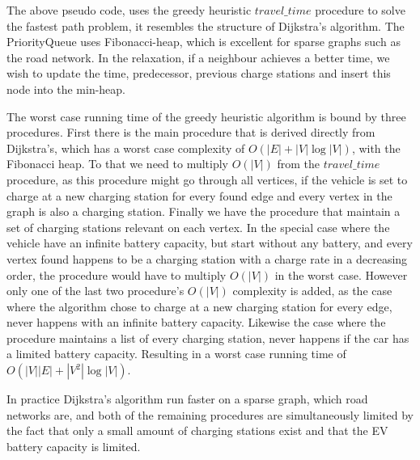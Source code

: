 The above pseudo code, uses the greedy heuristic $travel\_time$ procedure to solve the fastest path problem, it resembles the structure of Dijkstra's algorithm. The PriorityQueue uses Fibonacci-heap, which is excellent for sparse graphs such as the road network. In the relaxation, if a neighbour achieves a better time, we wish to update the time, predecessor, previous charge stations and insert this node into the min-heap.

The worst case running time of the greedy heuristic algorithm is bound by three procedures. First there is the main procedure that is derived directly from Dijkstra's, which has a worst case complexity of $O(|E|+|V|\log|V|)$, with the Fibonacci heap. To that we need to multiply $O(|V|)$ from the $travel\_time$ procedure, as this procedure might go through all vertices, if the vehicle is set to charge at a new charging station for every found edge and every vertex in the graph is also a charging station. Finally we have the procedure that maintain a set of charging stations relevant on each vertex. In the special case where the vehicle have an infinite battery capacity, but start without any battery, and every vertex found happens to be a charging station with a charge rate in a decreasing order, the procedure would have to multiply $O(|V|)$ in the worst case.
However only one of the last two procedure's $O(|V|)$ complexity is added, as the case where the algorithm chose to charge at a new charging station for every edge, never happens with an infinite battery capacity. Likewise the case where the procedure maintains a list of every charging station, never happens if the car has a limited battery capacity. Resulting in a worst case running time of $O(|V||E|+|V^2|\log|V|)$. %

In practice Dijkstra's algorithm run faster on a sparse graph, which road networks are, and both of the remaining procedures are simultaneously limited by the fact that only a small amount of charging stations exist and that the EV battery capacity is limited.
